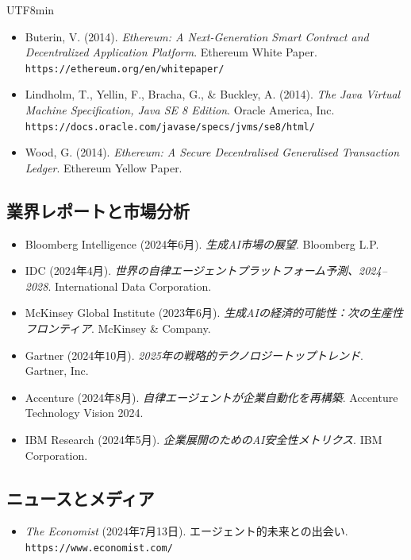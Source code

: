 \documentclass[11pt]{article}
\begin{document}
\begin{CJK}{UTF8}{min}
\begin{itemize}[noitemsep]
\begin{itemize}[leftmargin=*, label={}]
  \item Buterin, V. (2014). \textit{Ethereum: A Next-Generation Smart Contract and Decentralized Application Platform}. Ethereum White Paper. \texttt{https://ethereum.org/en/whitepaper/}

  \item Lindholm, T., Yellin, F., Bracha, G., \& Buckley, A. (2014). \textit{The Java Virtual Machine Specification, Java SE 8 Edition}. Oracle America, Inc. \texttt{https://docs.oracle.com/javase/specs/jvms/se8/html/}

  \item Wood, G. (2014). \textit{Ethereum: A Secure Decentralised Generalised Transaction Ledger}. Ethereum Yellow Paper.
\end{itemize}

\subsection*{業界レポートと市場分析}

\begin{itemize}[leftmargin=*, label={}]
  \item Bloomberg Intelligence (2024年6月). \textit{生成AI市場の展望}. Bloomberg L.P.

  \item IDC (2024年4月). \textit{世界の自律エージェントプラットフォーム予測、2024--2028}. International Data Corporation.

  \item McKinsey Global Institute (2023年6月). \textit{生成AIの経済的可能性：次の生産性フロンティア}. McKinsey \& Company.

  \item Gartner (2024年10月). \textit{2025年の戦略的テクノロジートップトレンド}. Gartner, Inc.

  \item Accenture (2024年8月). \textit{自律エージェントが企業自動化を再構築}. Accenture Technology Vision 2024.

  \item IBM Research (2024年5月). \textit{企業展開のためのAI安全性メトリクス}. IBM Corporation.
\end{itemize}

\subsection*{ニュースとメディア}

\begin{itemize}[leftmargin=*, label={}]
  \item \textit{The Economist} (2024年7月13日). エージェント的未来との出会い. \texttt{https://www.economist.com/}


\end{itemize}
\end{itemize}
\end{CJK}
\end{document}

